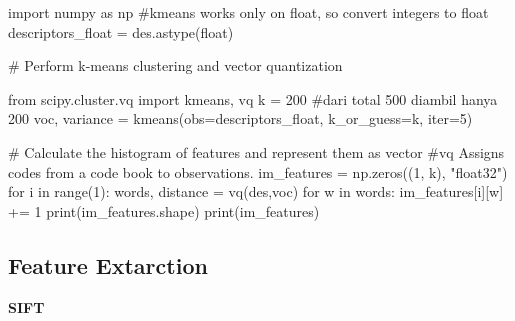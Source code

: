 \documentclass[
  letterpaper,
  DIV=11,
  numbers=noendperiod]{scrreprt}
\newenvironment{Shaded}{\begin{snugshade}}{\end{snugshade}}
\newcommand{\BuiltInTok}[1]{\textcolor[rgb]{0.00,0.23,0.31}{#1}}
\newcommand{\CommentTok}[1]{\textcolor[rgb]{0.37,0.37,0.37}{#1}}
\newcommand{\ControlFlowTok}[1]{\textcolor[rgb]{0.00,0.23,0.31}{#1}}
\newcommand{\DecValTok}[1]{\textcolor[rgb]{0.68,0.00,0.00}{#1}}
\newcommand{\ImportTok}[1]{\textcolor[rgb]{0.00,0.46,0.62}{#1}}
\newcommand{\KeywordTok}[1]{\textcolor[rgb]{0.00,0.23,0.31}{#1}}
\newcommand{\NormalTok}[1]{\textcolor[rgb]{0.00,0.23,0.31}{#1}}
\newcommand{\OperatorTok}[1]{\textcolor[rgb]{0.37,0.37,0.37}{#1}}
\newcommand{\StringTok}[1]{\textcolor[rgb]{0.13,0.47,0.30}{#1}}
\begin{document}
\begin{Shaded}
\begin{Highlighting}[]
\ImportTok{import}\NormalTok{ numpy }\ImportTok{as}\NormalTok{ np}
\CommentTok{\#kmeans works only on float, so convert integers to float}
\NormalTok{descriptors\_float }\OperatorTok{=}\NormalTok{ des.astype(}\BuiltInTok{float}\NormalTok{)  }

\CommentTok{\# Perform k{-}means clustering and vector quantization}

\ImportTok{from}\NormalTok{ scipy.cluster.vq }\ImportTok{import}\NormalTok{ kmeans, vq}
\NormalTok{k }\OperatorTok{=} \DecValTok{200}  \CommentTok{\#dari total 500 diambil hanya 200}
\NormalTok{voc, variance }\OperatorTok{=}\NormalTok{ kmeans(obs}\OperatorTok{=}\NormalTok{descriptors\_float, k\_or\_guess}\OperatorTok{=}\NormalTok{k, }\BuiltInTok{iter}\OperatorTok{=}\DecValTok{5}\NormalTok{) }


\CommentTok{\# Calculate the histogram of features and represent them as vector}
\CommentTok{\#vq Assigns codes from a code book to observations.}
\NormalTok{im\_features }\OperatorTok{=}\NormalTok{ np.zeros((}\DecValTok{1}\NormalTok{, k), }\StringTok{"float32"}\NormalTok{)}
\ControlFlowTok{for}\NormalTok{ i }\KeywordTok{in} \BuiltInTok{range}\NormalTok{(}\DecValTok{1}\NormalTok{):}
\NormalTok{    words, distance }\OperatorTok{=}\NormalTok{ vq(des,voc)}
    \ControlFlowTok{for}\NormalTok{ w }\KeywordTok{in}\NormalTok{ words:}
\NormalTok{        im\_features[i][w] }\OperatorTok{+=} \DecValTok{1}
\BuiltInTok{print}\NormalTok{(im\_features.shape)}
\BuiltInTok{print}\NormalTok{(im\_features)}
\end{Highlighting}
\end{Shaded}

\hypertarget{feature-extarction-1}{%
\subsection*{Feature Extarction}\label{feature-extarction-1}}

\textbf{SIFT}
\end{document}
